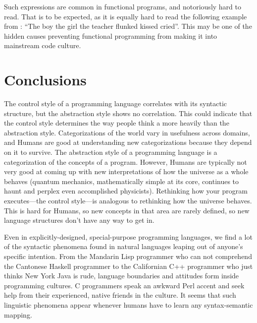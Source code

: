 \documentclass[12pt]{article}
\begin{document}
Such expressions are common in functional programs, and notoriously hard
to read.  That is to be expected, as it is equally hard to read the
following example from \cite{Abe-Hatasa-Cowan-1988}: ``The boy the girl
the teacher flunked kissed cried''.  This may be one of the hidden
causes preventing functional programming from making it into mainstream
code culture.

\section{Conclusions}

The control style of a programming language correlates with its
syntactic structure, but the abstraction style shows no correlation.
This could indicate that the control style determines the way people
think a more heavily than the abstraction style.  Categorizations of the
world vary in usefulness across domains, and Humans are good at
understanding new categorizations because they depend on it to survive.
The abstraction style of a programming language is a categorization of
the concepts of a program.  However, Humans are typically not very good
at coming up with new interpretations of how the universe as a whole
behaves (quantum mechanics, mathematically simple at its core, continues
to haunt and perplex even accomplished physicists).  Rethinking how your
program executes---the control style---is analogous to rethinking how
the universe behaves.  This is hard for Humans, so new concepts in that
area are rarely defined, so new language structures don't have any way
to get in.

Even in explicitly-designed, special-purpose programming languages, we
find a lot of the syntactic phenomena found in natural languages leaping
out of anyone's specific intention.  From the Mandarin Lisp programmer
who can not comprehend the Cantonese Haskell programmer to the
Californian C++ programmer who just thinks New York Java is rude,
language boundaries and attitudes form inside programming cultures.  C
programmers speak an awkward Perl accent and seek help from their
experienced, native friends in the culture.  It seems that such
linguistic phenomena appear whenever humans have to learn any
syntax-semantic mapping.

\newpage
\end{document}
